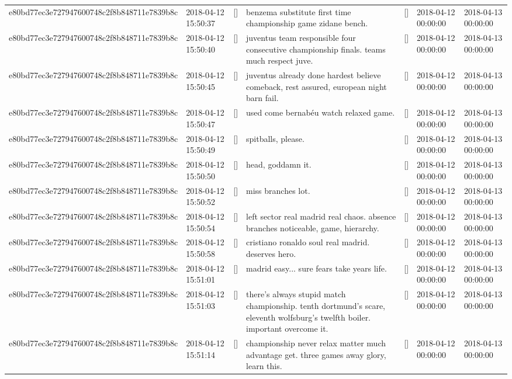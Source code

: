 \begin{tabular}{lllllll}
e80bd77ec3e727947600748c2f8b848711e7839b8c & 2018-04-12 15:50:37 & [] & benzema substitute first time championship game zidane bench. & [] & 2018-04-12 00:00:00 & 2018-04-13 00:00:00 \\
e80bd77ec3e727947600748c2f8b848711e7839b8c & 2018-04-12 15:50:40 & [] & juventus team responsible four consecutive championship finals. teams much respect juve. & [] & 2018-04-12 00:00:00 & 2018-04-13 00:00:00 \\
e80bd77ec3e727947600748c2f8b848711e7839b8c & 2018-04-12 15:50:45 & [] & juventus already done hardest believe comeback, rest assured, european night barn fail. & [] & 2018-04-12 00:00:00 & 2018-04-13 00:00:00 \\
e80bd77ec3e727947600748c2f8b848711e7839b8c & 2018-04-12 15:50:47 & [] & used come bernabéu watch relaxed game. & [] & 2018-04-12 00:00:00 & 2018-04-13 00:00:00 \\
e80bd77ec3e727947600748c2f8b848711e7839b8c & 2018-04-12 15:50:49 & [] & spitballs, please. & [] & 2018-04-12 00:00:00 & 2018-04-13 00:00:00 \\
e80bd77ec3e727947600748c2f8b848711e7839b8c & 2018-04-12 15:50:50 & [] & head, goddamn it. & [] & 2018-04-12 00:00:00 & 2018-04-13 00:00:00 \\
e80bd77ec3e727947600748c2f8b848711e7839b8c & 2018-04-12 15:50:52 & [] & miss branches lot. & [] & 2018-04-12 00:00:00 & 2018-04-13 00:00:00 \\
e80bd77ec3e727947600748c2f8b848711e7839b8c & 2018-04-12 15:50:54 & [] & left sector real madrid real chaos. absence branches noticeable, game, hierarchy. & [] & 2018-04-12 00:00:00 & 2018-04-13 00:00:00 \\
e80bd77ec3e727947600748c2f8b848711e7839b8c & 2018-04-12 15:50:58 & [] & cristiano ronaldo soul real madrid. deserves hero. & [] & 2018-04-12 00:00:00 & 2018-04-13 00:00:00 \\
e80bd77ec3e727947600748c2f8b848711e7839b8c & 2018-04-12 15:51:01 & [] & madrid easy... sure fears take years life. & [] & 2018-04-12 00:00:00 & 2018-04-13 00:00:00 \\
e80bd77ec3e727947600748c2f8b848711e7839b8c & 2018-04-12 15:51:03 & [] & there's always stupid match championship. tenth dortmund's scare, eleventh wolfsburg's twelfth boiler. important overcome it. & [] & 2018-04-12 00:00:00 & 2018-04-13 00:00:00 \\
e80bd77ec3e727947600748c2f8b848711e7839b8c & 2018-04-12 15:51:14 & [] & championship never relax matter much advantage get. three games away glory, learn this. & [] & 2018-04-12 00:00:00 & 2018-04-13 00:00:00 \\

\end{tabular}
